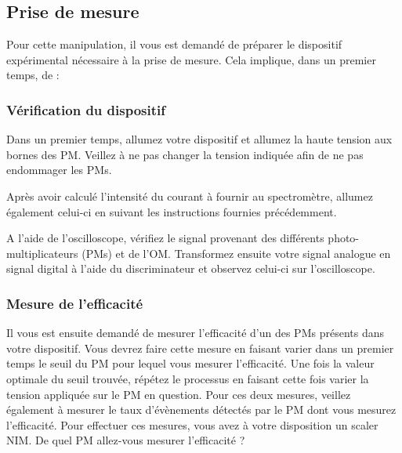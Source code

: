 \subsection{Prise de mesure}
Pour cette manipulation, il vous est demandé de préparer le dispositif expérimental nécessaire à la prise de mesure. Cela implique, dans un premier temps, de :
\begin{center}
\end{center}

\subsubsection{Vérification du dispositif}
Dans un premier temps, allumez votre dispositif et allumez la haute tension aux bornes des PM. Veillez à ne pas changer la tension indiquée afin de ne pas endommager les PMs.

Après avoir calculé l'intensité du courant à fournir au spectromètre, allumez également celui-ci en suivant les instructions fournies précédemment.

A l'aide de l'oscilloscope, vérifiez le signal provenant des différents photo-multiplicateurs (PMs) et de l'OM. Transformez ensuite votre signal analogue en signal digital à l'aide du discriminateur et observez celui-ci sur l'oscilloscope.

\subsubsection{Mesure de l'efficacité}
Il vous est ensuite demandé de mesurer l'efficacité d'un des PMs présents dans votre dispositif. Vous devrez faire cette mesure en faisant varier dans un premier temps le seuil du PM pour lequel vous mesurer l'efficacité. Une fois la valeur optimale du seuil trouvée, répétez le processus en faisant cette fois varier la tension appliquée sur le PM en question. Pour ces deux mesures, veillez également à mesurer le taux d'évènements détectés par le PM dont vous mesurez l'efficacité. Pour effectuer ces mesures, vous avez à votre disposition un scaler NIM. De quel PM allez-vous mesurer l'efficacité ?

